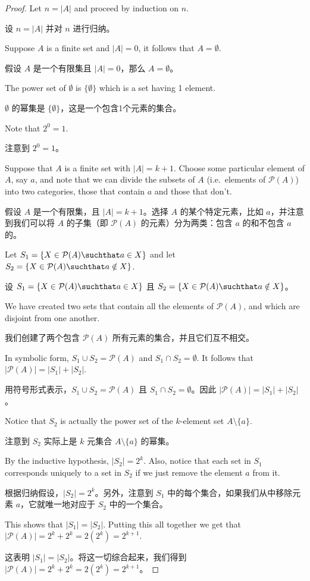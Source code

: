 \begin{proof}
Let $n = |A|$ and proceed by induction on $n$.

设 $n = |A|$ 并对 $n$ 进行归纳。

 Suppose $A$ is a finite set and $|A| = 0$, it follows 
that $A = \emptyset$.

 假设 $A$ 是一个有限集且 $|A| = 0$，那么 $A = \emptyset$。

The power set of $\emptyset$ is $\{ \emptyset \}$ 
which is a set having 1 element.

$\emptyset$ 的幂集是 $\{ \emptyset \}$，这是一个包含1个元素的集合。

Note that $2^0 = 1$.
   
注意到 $2^0 = 1$。
   
  Suppose that $A$ is a finite set with $|A| = k+1$.  Choose some particular element of $A$, say $a$, and note that
we can divide the subsets of $A$ (i.e.\ elements of ${\mathcal P}(A)$) into
two categories, those that contain $a$ and those that don't.

 假设 $A$ 是一个有限集，且 $|A| = k+1$。选择 $A$ 的某个特定元素，比如 $a$，并注意到我们可以将 $A$ 的子集（即 ${\mathcal P}(A)$ 的元素）分为两类：包含 $a$ 的和不包含 $a$ 的。

Let $S_1 = \{ X \in {\mathcal P}(A) \suchthat a \in X \}$ and let
$S_2 = \{ X \in {\mathcal P}(A) \suchthat a \notin X \}$.

设 $S_1 = \{ X \in {\mathcal P}(A) \suchthat a \in X \}$ 且 $S_2 = \{ X \in {\mathcal P}(A) \suchthat a \notin X \}$。

We have 
created two sets that contain all the elements of ${\mathcal P}(A)$,
and which are disjoint from one another.

我们创建了两个包含 ${\mathcal P}(A)$ 所有元素的集合，并且它们互不相交。

In symbolic form, 
$S_1 \cup S_2 = {\mathcal P}(A)$ and $S_1 \cap S_2 = \emptyset$.
It follows that $|{\mathcal P}(A)| = |S_1| + |S_2|$.  

用符号形式表示，$S_1 \cup S_2 = {\mathcal P}(A)$ 且 $S_1 \cap S_2 = \emptyset$。因此 $|{\mathcal P}(A)| = |S_1| + |S_2|$。

Notice that $S_2$ is actually the power set of the $k$-element set
$A \setminus \{ a \}$.

注意到 $S_2$ 实际上是 $k$ 元集合 $A \setminus \{ a \}$ 的幂集。

By the inductive hypothesis, $|S_2| = 2^k$.
Also, notice that each set in $S_1$ corresponds uniquely to a set in
$S_2$ if we just remove the element $a$ from it.

根据归纳假设，$|S_2| = 2^k$。另外，注意到 $S_1$ 中的每个集合，如果我们从中移除元素 $a$，它就唯一地对应于 $S_2$ 中的一个集合。

This shows that 
$|S_1| = |S_2|$.  Putting this all together we get that 
$|{\mathcal P}(A)| = 2^k + 2^k = 2(2^k) = 2^{k+1}$.

这表明 $|S_1| = |S_2|$。将这一切综合起来，我们得到 $|{\mathcal P}(A)| = 2^k + 2^k = 2(2^k) = 2^{k+1}$。

\end{proof}

